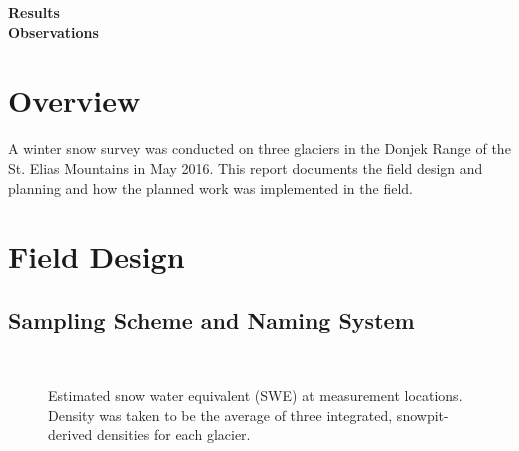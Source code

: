 \documentclass[12pt]{article}
\begin{document}

\begin{center}
\Large \textbf{Results\\ Observations}
\end{center}


\section*{Overview}

A winter snow survey was conducted on three glaciers in the Donjek Range of the St. Elias Mountains in May 2016. This report documents the field design and planning and how the planned work was implemented in the field.


\pagebreak

\section{Field Design}

\subsection{Sampling Scheme and Naming System}


\begin{landscape}
\begin{figure}
	\centering
	\\
	\caption{Estimated snow water equivalent (SWE) at measurement locations. Density was taken to be the average of three integrated, snowpit-derived densities for each glacier.}
	\label{studysites}
\end{figure}


\end{landscape}
\end{document}

